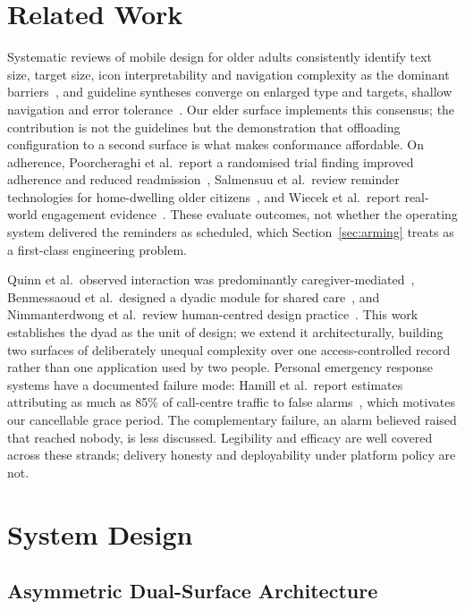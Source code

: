 \documentclass[runningheads,a4paper]{llncs}
\begin{document}
\section{Related Work}
\label{sec:related}

Systematic reviews of mobile design for older adults consistently identify text size,
target size, icon interpretability and navigation complexity as the dominant
barriers~\cite{awan,elguera,liu}, and guideline syntheses converge on enlarged type and
targets, shallow navigation and error tolerance~\cite{gomez,amouzadeh}. Our elder surface
implements this consensus; the contribution is not the guidelines but the demonstration that
offloading configuration to a second surface is what makes conformance affordable. On
adherence, Poorcheraghi et al.\ report a randomised trial finding improved adherence and
reduced readmission~\cite{poor}, Salmensuu et al.\ review reminder technologies for
home-dwelling older citizens~\cite{salmensuu}, and Wiecek et al.\ report real-world
engagement evidence~\cite{wiecek}. These evaluate outcomes, not whether the operating system
delivered the reminders as scheduled, which Section~\ref{sec:arming} treats as a first-class
engineering problem.

Quinn et al.\ observed interaction was predominantly caregiver-mediated~\cite{quinn},
Benmessaoud et al.\ designed a dyadic module for shared care~\cite{benmessaoud}, and
Nimmanterdwong et al.\ review human-centred design practice~\cite{nimman}. This work
establishes the dyad as the unit of design; we extend it architecturally, building two
surfaces of deliberately unequal complexity over one access-controlled record rather than
one application used by two people. Personal emergency response systems have a documented
failure mode: Hamill et al.\ report estimates attributing as much as 85\% of call-centre
traffic to false alarms~\cite{hamill}, which motivates our cancellable grace period. The
complementary failure, an alarm believed raised that reached nobody, is less discussed.
Legibility and efficacy are well covered across these strands; delivery honesty and
deployability under platform policy are not.

\section{System Design}

\subsection{Asymmetric Dual-Surface Architecture}
\label{sec:asym}
\end{document}
